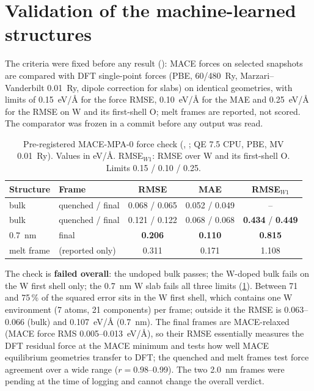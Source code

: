 \section{Validation of the machine-learned structures}
\label{sec:mono-am-mlval}

The criteria were fixed before any result (): MACE forces on
selected snapshots are compared with DFT single-point forces (PBE, 60/480~Ry, Marzari--Vanderbilt 0.01~Ry, dipole
correction for slabs) on identical geometries, with limits of 0.15~eV/\AA{} for the force RMSE, 0.10~eV/\AA{} for the
MAE and 0.25~eV/\AA{} for the RMSE on W and its first-shell O; melt frames are reported, not scored. The comparator was
frozen in a commit before any output was read.

\begin{table}[htbp]\centering\small
\caption{Pre-registered MACE-MPA-0 force check (, ; QE 7.5 CPU, PBE, MV 0.01~Ry). Values in
eV/\AA. RMSE$_{W1}$: RMSE over W and its first-shell O. Limits 0.15 / 0.10 / 0.25.}
\label{tab:mono-am-mace}
\begin{tabular}{llccc}\toprule
Structure & Frame & RMSE & MAE & RMSE$_{W1}$ \\\midrule
\aIO{} bulk & quenched / final & 0.068 / 0.065 & 0.052 / 0.049 & -- \\
\aIWO{} bulk & quenched / final & 0.121 / 0.122 & 0.068 / 0.068 & \textbf{0.434} / \textbf{0.449} \\
\aIWO{} 0.7~nm & final & \textbf{0.206} & \textbf{0.110} & \textbf{0.815} \\
melt frame & (reported only) & 0.311 & 0.171 & 1.108 \\\bottomrule
\end{tabular}
\end{table}

The check is \textbf{failed overall}: the undoped bulk passes; the W-doped bulk fails on the W first shell only; the
0.7~nm W slab fails all three limits (\cref{tab:mono-am-mace}). Between 71 and 75\,\% of the squared error sits in the
W first shell, which contains one W environment (7 atoms, 21 components) per frame; outside it the RMSE is
0.063--0.066 (bulk) and 0.107~eV/\AA{} (0.7~nm). The final frames are MACE-relaxed (MACE force RMS
0.005--0.013~eV/\AA), so their RMSE essentially measures the DFT residual force at the MACE minimum and tests how well
MACE equilibrium geometries transfer to DFT; the quenched and melt frames test force agreement over a wide range
($r = 0.98$--0.99). The two 2.0~nm frames were pending at the time of logging and cannot change the overall verdict.

